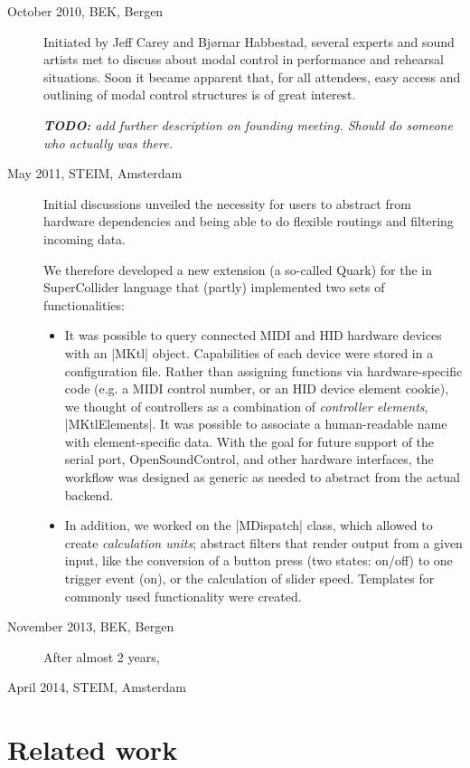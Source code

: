 \documentclass{article}
\newcommand{\todo}[1] {\emph{\textbf{TODO:} #1}}
\begin{document}
\begin{description}
	\item[October 2010, BEK, Bergen] Initiated by Jeff Carey and Bjørnar Habbestad, several experts and sound artists met to discuss about modal control in performance and rehearsal situations.
	Soon it became apparent that, for all attendees, easy access and outlining of modal control structures is of great interest.
	
	\todo{add further description on founding meeting. Should do someone who actually was there.}
	\item[May 2011, STEIM, Amsterdam] Initial discussions unveiled the necessity for users to abstract from hardware dependencies and being able to do flexible routings and filtering incoming data.

	We therefore developed a new extension (a so-called Quark) for the in SuperCollider language that (partly) implemented two sets of functionalities:
	
	\begin{itemize}
		\item 	It was possible to query connected MIDI and HID hardware devices with an |MKtl| object. 
		Capabilities of each device were stored in a configuration file. 
		Rather than assigning functions via hardware-specific code (e.g. a MIDI control number, or an HID device element cookie), we thought of controllers as a combination of \emph{controller elements}, |MKtlElements|. 
		It was possible to associate a human-readable name with element-specific data.
		With the goal for future support of the serial port, OpenSoundControl, and other hardware interfaces, the workflow was designed as generic as needed to abstract from the actual backend.
		\item In addition, we worked on the |MDispatch| class, which allowed to create \emph{calculation units}; abstract filters that render output from a given input, like the conversion of a button press (two states: on/off) to one trigger event (on), or the calculation of slider speed. 
		Templates for commonly used functionality were created.
	\end{itemize}
	\item[November 2013, BEK, Bergen] After almost 2 years, 
	\item[April 2014, STEIM, Amsterdam]
 
\end{description}



\section{Related work}
\label{sec:related_work}
\end{document}
